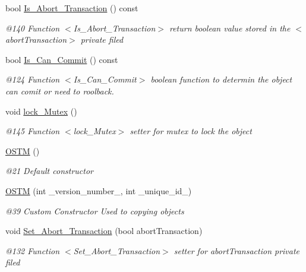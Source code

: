 \begin{DoxyCompactItemize}
bool \hyperlink{class_o_s_t_m_afc2851abf5342c3c67342c2c14820115_afc2851abf5342c3c67342c2c14820115}{Is\+\_\+\+Abort\+\_\+\+Transaction} () const 
\begin{DoxyCompactList}\small\item\em @140 Function $<$\+Is\+\_\+\+Abort\+\_\+\+Transaction$>$ return boolean value stored in the $<$abort\+Transaction$>$ private filed \end{DoxyCompactList}\item 
bool \hyperlink{class_o_s_t_m_a8df39ced3b401aa466df97e26d14b1b7_a8df39ced3b401aa466df97e26d14b1b7}{Is\+\_\+\+Can\+\_\+\+Commit} () const 
\begin{DoxyCompactList}\small\item\em @124 Function $<$\+Is\+\_\+\+Can\+\_\+\+Commit$>$ boolean function to determin the object can comit or need to roolback. \end{DoxyCompactList}\item 
void \hyperlink{class_o_s_t_m_af192c598a3c647f37aaba5757e60240f_af192c598a3c647f37aaba5757e60240f}{lock\+\_\+\+Mutex} ()
\begin{DoxyCompactList}\small\item\em @145 Function $<$lock\+\_\+\+Mutex$>$ setter for mutex to lock the object \end{DoxyCompactList}\item 
\hyperlink{class_o_s_t_m_a968edf778668bd0ec7603f0571619196_a968edf778668bd0ec7603f0571619196}{O\+S\+TM} ()
\begin{DoxyCompactList}\small\item\em @21 Default constructor \end{DoxyCompactList}\item 
\hyperlink{class_o_s_t_m_a2314f55a127b94aa8a51d19ba798401e_a2314f55a127b94aa8a51d19ba798401e}{O\+S\+TM} (int \+\_\+version\+\_\+number\+\_\+, int \+\_\+unique\+\_\+id\+\_\+)
\begin{DoxyCompactList}\small\item\em @39 Custom Constructor Used to copying objects \end{DoxyCompactList}\item 
void \hyperlink{class_o_s_t_m_aba384cf65c5f56f5b86833730c3c6ea4_aba384cf65c5f56f5b86833730c3c6ea4}{Set\+\_\+\+Abort\+\_\+\+Transaction} (bool abort\+Transaction)
\begin{DoxyCompactList}\small\item\em @132 Function $<$\+Set\+\_\+\+Abort\+\_\+\+Transaction$>$ setter for abort\+Transaction private filed \end{DoxyCompactList}\item 

\end{DoxyCompactItemize}
